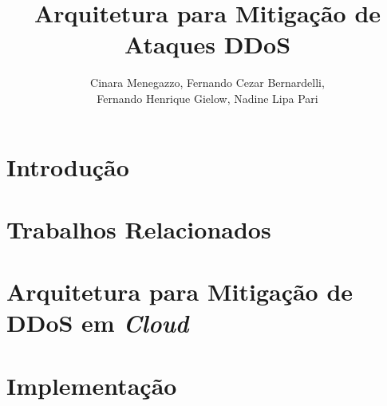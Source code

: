 \documentclass[a4paper, 12pt]{article}
\begin{document}
\title{Arquitetura para Mitigação de Ataques DDoS}

\author{
Cinara Menegazzo,
Fernando Cezar Bernardelli, \\
Fernando Henrique Gielow,
Nadine Lipa Pari
}
   

   
\address{Departamento de Informática -- Universidade Federal do Paraná\\
NR2 - Núcleo de Redes Sem Fio e Redes Avançadas\\
  Caixa Postal 19.081 -- 81.531-980 -- Curitiba -- PR -- Brasil
}     

\maketitle


\begin{resumo}

\end{resumo}



\section{Introdução}



\section{Trabalhos Relacionados}

 



\section{Arquitetura para Mitigação de DDoS em \emph{Cloud}}



\section{Implementação}

% 


\end{document}
